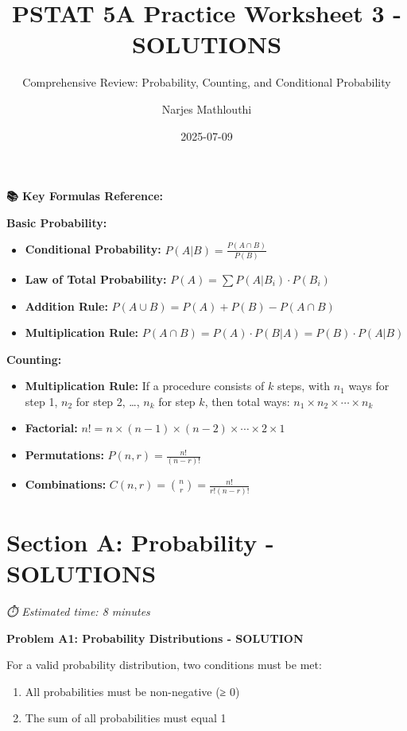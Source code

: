 \documentclass[
  11pt,
]{article}
\title{PSTAT 5A Practice Worksheet 3 - SOLUTIONS}
\subtitle{Comprehensive Review: Probability, Counting, and Conditional
Probability}
\author{Narjes Mathlouthi}
\date{2025-07-09}
\renewcommand*\contentsname{Table of contents}
\newcommand\contentsname{Table of contents}
\begin{document}
\maketitle

\renewcommand*\contentsname{Table of contents}
{
\hypersetup{linkcolor=}
\setcounter{tocdepth}{3}
\tableofcontents
}

\textbf{📚 Key Formulas Reference:}

\textbf{Basic Probability:}

\begin{itemize}
\item
  \textbf{Conditional Probability:}
  \(P(A|B) = \frac{P(A \cap B)}{P(B)}\)
\item
  \textbf{Law of Total Probability:}
  \(P(A) = \sum P(A|B_i) \cdot P(B_i)\)
\item
  \textbf{Addition Rule:} \(P(A \cup B) = P(A) + P(B) - P(A \cap B)\)
\item
  \textbf{Multiplication Rule:}
  \(P(A \cap B) = P(A) \cdot P(B|A) = P(B) \cdot P(A|B)\)
\end{itemize}

\textbf{Counting:}

\begin{itemize}
\item
  \textbf{Multiplication Rule:} If a procedure consists of \(k\) steps,
  with \(n_1\) ways for step 1, \(n_2\) for step 2, \ldots, \(n_k\) for
  step \(k\), then total ways:
  \(n_1 \times n_2 \times \cdots \times n_k\)
\item
  \textbf{Factorial:}
  \(n! = n \times (n-1) \times (n-2) \times \cdots \times 2 \times 1\)
\item
  \textbf{Permutations:} \(P(n,r) = \frac{n!}{(n-r)!}\)
\item
  \textbf{Combinations:} \(C(n,r) = \binom{n}{r} = \frac{n!}{r!(n-r)!}\)
\end{itemize}

\section{Section A: Probability -
SOLUTIONS}\label{section-a-probability---solutions}

\emph{⏱️ Estimated time: 8 minutes}

\textbf{Problem A1: Probability Distributions - SOLUTION}

For a valid probability distribution, two conditions must be met:

\begin{enumerate}
\def\labelenumi{\arabic{enumi}.}
\item
  All probabilities must be non-negative (≥ 0)
\item
  The sum of all probabilities must equal 1
\end{enumerate}
\end{document}
